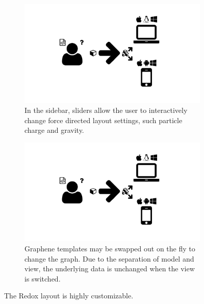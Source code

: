 \begin{figure}
  \centering
  \begin{subfigure}[b]{\textwidth}
    \includegraphics[width=\textwidth, page=7,trim=0.37cm 3.65cm 13.1cm 3.3cm, clip=true]{images/Figures.pdf}
    \caption{In the sidebar, sliders allow the user to interactively change force directed layout settings, such particle charge and gravity.}
    \label{Figure:redox-template-a}
  \end{subfigure}
  \begin{subfigure}[b]{\textwidth}
    \includegraphics[width=\textwidth, page=7,trim=13.1cm 3.65cm 0.37cm 3.3cm, clip=true]{images/Figures.pdf}
    \caption{Graphene templates may be swapped out on the fly to change the graph.
      Due to the separation of model and view, the underlying data is unchanged when the view is switched.}
    \label{Figure:redox-template-b}
  \end{subfigure}
  \caption{The Redox layout is highly customizable.}
  \label{Figure:redox-template}
\end{figure}


